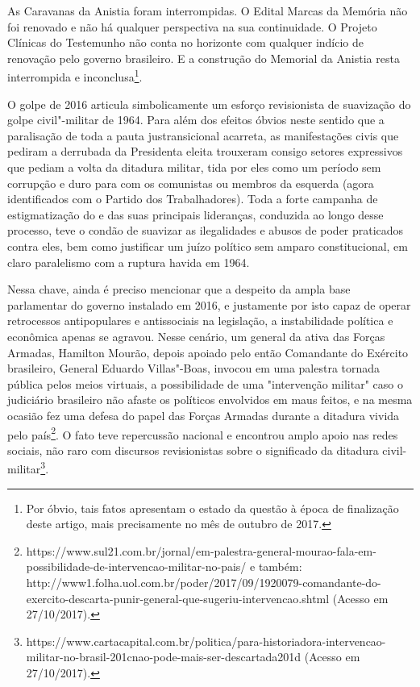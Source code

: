 As Caravanas da Anistia foram interrompidas. O Edital Marcas da Memória
não foi renovado e não há qualquer perspectiva na sua continuidade. O
Projeto Clínicas do Testemunho não conta no horizonte com qualquer
indício de renovação pelo governo brasileiro. E a construção do Memorial
da Anistia resta interrompida e inconclusa\footnote{Por óbvio, tais
  fatos apresentam o estado da questão à época de finalização deste
  artigo, mais precisamente no mês de outubro de 2017.}.

O golpe de 2016 articula simbolicamente um esforço revisionista de
suavização do golpe civil"-militar de 1964. Para além dos efeitos óbvios
neste sentido que a paralisação de toda a pauta justransicional
acarreta, as manifestações civis que pediram a derrubada da Presidenta
eleita trouxeram consigo setores expressivos que pediam a volta da
ditadura militar, tida por eles como um período sem corrupção e duro
para com os comunistas ou membros da esquerda (agora identificados com o
Partido dos Trabalhadores). Toda a forte campanha de estigmatização do
 e das suas principais lideranças, conduzida ao longo desse processo,
teve o condão de suavizar as ilegalidades e abusos de poder praticados
contra eles, bem como justificar um juízo político sem amparo
constitucional, em claro paralelismo com a ruptura havida em 1964.

Nessa chave, ainda é preciso mencionar que a despeito da ampla base
parlamentar do governo instalado em 2016, e justamente por isto capaz de
operar retrocessos antipopulares e antissociais na legislação, a
instabilidade política e econômica apenas se agravou. Nesse cenário, um
general da ativa das Forças Armadas, Hamilton Mourão, depois apoiado
pelo então Comandante do Exército brasileiro, General Eduardo
Villas"-Boas, invocou em uma palestra tornada pública pelos meios
virtuais, a possibilidade de uma "intervenção militar" caso o judiciário
brasileiro não afaste os políticos envolvidos em maus feitos, e na mesma
ocasião fez uma defesa do papel das Forças Armadas durante a ditadura
vivida pelo país\footnote{https://www.sul21.com.br/jornal/em-palestra-general-mourao-fala-em-possibilidade-de-intervencao-militar-no-pais/
  e também:
  http://www1.folha.uol.com.br/poder/2017/09/1920079-comandante-do-exercito-descarta-punir-general-que-sugeriu-intervencao.shtml
  (Acesso em 27/10/2017).}. O fato teve repercussão nacional e encontrou
amplo apoio nas redes sociais, não raro com discursos revisionistas
sobre o significado da ditadura civil-militar\footnote{https://www.cartacapital.com.br/politica/para-historiadora-intervencao-militar-no-brasil-201cnao-pode-mais-ser-descartada201d
  (Acesso em 27/10/2017).}.

